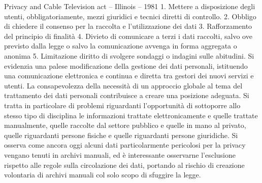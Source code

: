 Privacy and Cable Television act – Illinois – 1981
1.	Mettere a disposizione degli utenti, obbligatoriamente, mezzi giuridici e tecnici diretti di controllo.
2.	Obbligo di chiedere il consenso per la raccolta e l’utilizzazione dei dati
3.	Rafforzamento del principio di finalità
4.	Divieto di comunicare a terzi i dati raccolti, salvo ove previsto dalla legge o salvo la comunicazione avvenga in forma aggregata o anonima
5.	Limitazione diritto di svolgere sondaggi o indagini sulle abitudini.
Si evidenzia una palese modificazione della gestione dei dati personali, istituendo una comunicazione elettronica e continua e diretta tra gestori dei nuovi servizi e utenti.
La consapevolezza della necessità di un approccio globale al tema del trattamento dei dati personali contribuisce a creare una posizione adeguata. Si tratta in particolare di problemi riguardanti l’opportunità di sottoporre allo stesso tipo di disciplina le informazioni trattate elettronicamente e quelle trattate manualmente, quelle raccolte dal settore pubblico e quelle in mano al privato, quelle riguardanti persone fisiche e quelle riguardanti persone giuridiche.
Si osserva come ancora oggi alcuni dati particolarmente pericolosi per la privacy vengano tenuti in archivi manuali, ed è interessante osservarne l’esclusione rispetto alle regole sulla circolazione dei dati, portando al rischio di creazione volontaria di archivi manuali col solo scopo di sfuggire la legge.

